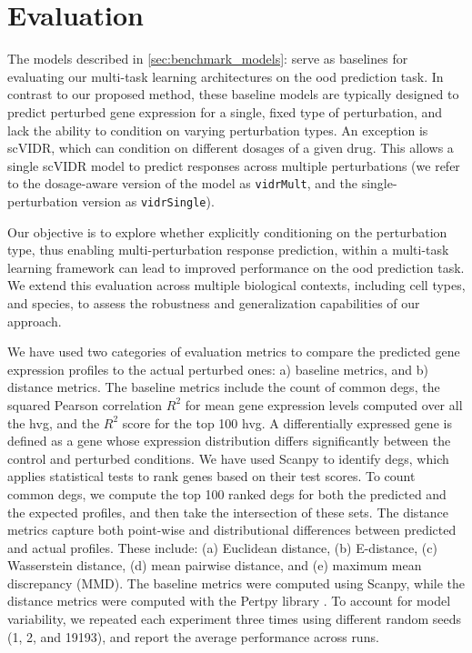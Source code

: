 \documentclass[12pt, a4paper]{article}
\newcommand{\crefwithname}[1]{\cref{#1}: \nameref{#1}}
\begin{document}
\section{Evaluation}




The models described in \crefwithname{sec:benchmark_models} serve as baselines for evaluating our multi-task learning architectures on the \gls{ood} prediction task.
In contrast to our proposed method, these baseline models are typically designed to predict perturbed gene expression for a single, fixed type of perturbation, and lack the ability to condition on varying perturbation types. An exception is scVIDR, which can condition on different dosages of a given drug. This allows a single scVIDR model to predict responses across multiple perturbations
(we refer to the dosage-aware version of the model as \verb|vidrMult|, and the single-perturbation version as \verb|vidrSingle|).

Our objective is to explore whether explicitly conditioning on the perturbation type, thus enabling multi-perturbation response prediction, within a multi-task learning framework can lead to improved performance on the \gls{ood} prediction task.
We extend this evaluation across multiple biological contexts, including cell types, and species, to assess the robustness and generalization capabilities of our approach.

We have used two categories of evaluation metrics to compare the predicted gene expression profiles to the actual perturbed ones: a) baseline metrics, and b) distance metrics. The baseline metrics include the count of common \gls{degs}, the squared Pearson correlation $R^2$ for mean gene expression levels computed over all the \gls{hvg}, and the $R^2$ score for the top 100 \gls{hvg}. A differentially expressed gene is defined as a gene whose expression distribution differs significantly between the control and perturbed conditions. We have used Scanpy \cite{wolf2018scanpy} to identify \gls{degs}, which applies statistical tests to rank genes based on their test scores. To count common \gls{degs}, we compute the top 100 ranked \gls{degs} for both the predicted and the expected profiles, and then take the intersection of these sets.
The distance metrics capture both point-wise and distributional differences between predicted and actual profiles. These include: (a) Euclidean distance, (b) E-distance, (c) Wasserstein distance, (d) mean pairwise distance, and (e) maximum mean discrepancy (MMD).
The baseline metrics were computed using Scanpy, while the distance metrics were computed with the Pertpy library \cite{heumos2024pertpy}.
To account for model variability, we repeated each experiment three times using different random seeds (1, 2, and 19193), and report the average performance across runs.
\end{document}
